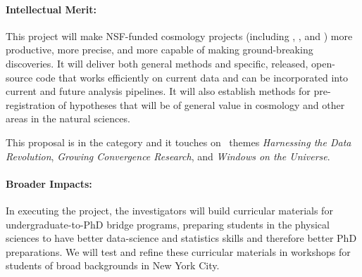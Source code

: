 \documentclass[12pt, fullpage, letterpaper]{article}
\begin{document}
\paragraph{Intellectual Merit:}
This project will make NSF-funded cosmology projects (including
\SDSSIV, \DESI, and \LSST) more productive, more precise, and more
capable of making ground-breaking discoveries.
It will deliver both general methods and specific, released,
open-source code that works efficiently on current data and can be
incorporated into current and future analysis pipelines.
It will also establish methods for pre-registration of hypotheses that
will be of general value in cosmology and other areas in the natural
sciences.

This proposal is in the  category and
it touches on \NSF\ themes
\textsl{Harnessing the Data Revolution},
\textsl{Growing Convergence Research}, and
\textsl{Windows on the Universe}.

\paragraph{Broader Impacts:}
In executing the project, the investigators will build curricular
materials for undergraduate-to-PhD bridge programs, preparing students
in the physical sciences to have better data-science and statistics
skills and therefore better PhD preparations.
We will test and refine these curricular materials in workshops for
students of broad backgrounds in New York City.
\end{document}
